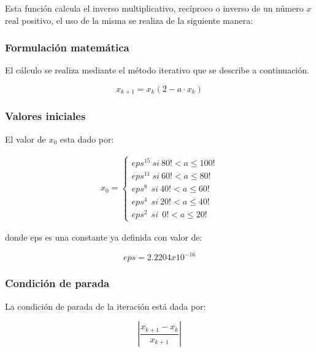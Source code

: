 \documentclass[10pt,a4paper]{article}
\begin{document}
	Esta función calcula el inverso multiplicativo, recíproco o inverso de un número $x$ real positivo, el uso de la misma se realiza de la siguiente manera:
	
	\begin{center}
	\end{center}
	
	\subsubsection{Formulación matemática}
	
	El cálculo se realiza mediante el método iterativo que se describe a continuación.
	
	\begin{equation}\label{key1}
		x_{k+1} = x_{k}(2 - a\cdot x_{k})
	\end{equation}
		
	\subsubsection{Valores iniciales}
	
	El valor de $x_{0}$ esta dado por:
	
	\begin{align*}
		x_{0} = 
		\begin{cases}
			eps^{15}~ si~  80! < a \leq 100! \\
			eps^{11}~ si~  60! < a \leq 80! \\
			eps^{8}~~ si~  40! < a \leq 60! \\
			eps^{4}~~ si~  20! < a \leq 40! \\
			eps^{2}~~ si~~  0! < a \leq 20!
		\end{cases}
	\end{align*}
	
	donde eps es una constante ya definida con valor de:
	
	\begin{equation}\label{key2}
		eps = 2.2204x10^{-16}
	\end{equation}
	
	\subsubsection{Condición de parada}
	
	La condición de parada de la iteración está dada por: 
	
	\begin{equation}\label{key3}
		\left\lvert{\frac{x_{k+1} - x_{k}}{x_{k+1}}}\right\lvert
	\end{equation}
\end{document}
